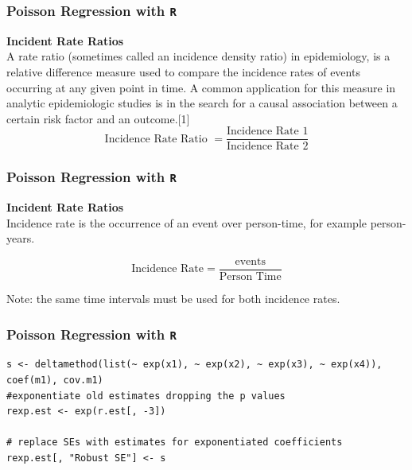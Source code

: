 \documentclass[00-GLMregslides.tex]{subfiles}
\begin{document}
\begin{frame}[fragile]

\frametitle{Poisson Regression with \texttt{R}}
\Large 
\textbf{Incident Rate Ratios}\\
A rate ratio (sometimes called an incidence density ratio) in epidemiology, is a relative difference measure used to compare the incidence rates of events occurring at any given point in time. A common application for this measure in analytic epidemiologic studies is in the search for a causal association between a certain risk factor and an outcome.[1]
\[ \mbox{Incidence Rate Ratio }  = \frac{\mbox{Incidence Rate 1}}{\mbox{Incidence Rate 2}} \]
\end{frame}
\begin{frame}[fragile]

\frametitle{Poisson Regression with \texttt{R}}
\Large 
\textbf{Incident Rate Ratios} \\
Incidence rate is the occurrence of an event over person-time, for example person-years.
 
\[ \mbox{Incidence Rate}  = \frac{\mbox{events}}{\mbox{Person Time}} \]

Note: the same time intervals must be used for both incidence rates.
\end{frame}
\begin{frame}[fragile]

\frametitle{Poisson Regression with \texttt{R}}
\Large

\begin{framed}
\begin{verbatim}
s <- deltamethod(list(~ exp(x1), ~ exp(x2), ~ exp(x3), ~ exp(x4)), coef(m1), cov.m1)
#exponentiate old estimates dropping the p values
rexp.est <- exp(r.est[, -3])

# replace SEs with estimates for exponentiated coefficients
rexp.est[, "Robust SE"] <- s
\end{verbatim}
\end{framed}
\end{frame}
\end{document}
